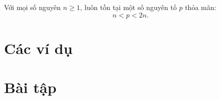 \documentclass[../../imo-training-open-book.tex]{subfiles}
\begin{document}
\begin{theorem}[Bổ đề Bertrand]
    \label{theorem:bertrand}
    Với mọi số nguyên \( n \geq 1 \), luôn tồn tại một số nguyên tố \( p \) thỏa mãn:
    \[
        n < p < 2n.
    \]
\end{theorem}

\newpage

\section{Các ví dụ}




\newpage

\section{Bài tập}

\newpage
\end{document}
